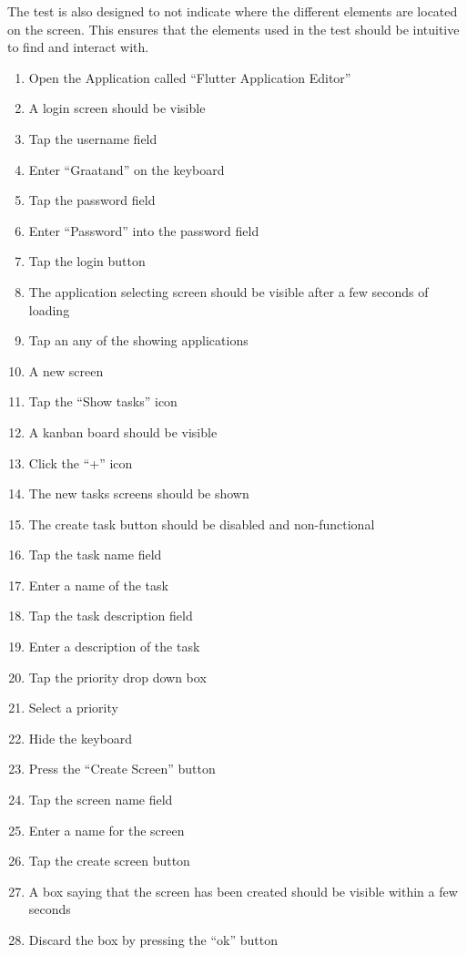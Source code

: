 The test is also designed to not indicate where the different elements are located on the screen.
This ensures that the elements used in the test should be intuitive to find and interact with. 
\begin{enumerate}
    \item Open the Application called “Flutter Application Editor”
    \item A login screen should be visible
    \item Tap the username field
    \item Enter “Graatand” on the keyboard
    \item Tap the password field
    \item Enter “Password” into the password field
    \item Tap the login button
    \item The application selecting screen should be visible after a few seconds of loading
    \item Tap an any of the showing applications
    \item A new screen
    \item Tap the “Show tasks” icon
    \item A kanban board should be visible
    \item Click the “+” icon
    \item The new tasks screens should be shown
    \item The create task button should be disabled and non-functional 
    \item Tap the task name field
    \item Enter a name of the task
    \item Tap the task description field
    \item Enter a description of the task
    \item Tap the priority drop down box
    \item Select a priority
    \item Hide the keyboard
    \item Press the “Create Screen” button
    \item Tap the screen name field
    \item Enter a name for the screen
    \item Tap the create screen button
    \item A box saying that the screen has been created should be visible within a few seconds
    \item Discard the box by pressing the “ok” button

\end{enumerate}
